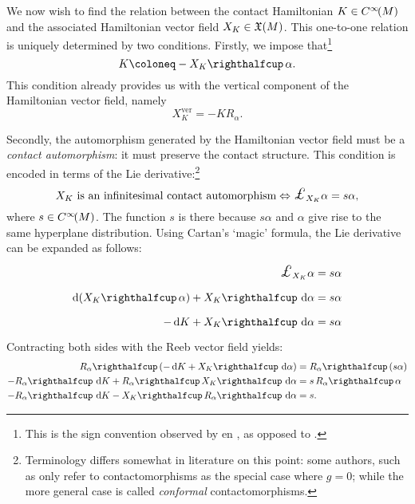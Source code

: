 We now wish to find the relation between the contact Hamiltonian \(K \in C^\infty\!\qty(M)\) and the associated Hamiltonian vector field \(X_K \in \mathfrak{X}\qty(M)\). This one-to-one relation is uniquely determined by two conditions. Firstly, we impose that\footnote{This is the sign convention observed by \citet{Bravetti2017} en \citet{VanderSchaft2021a}, as opposed to \citet{Libermann1987}.}
    \begin{equation}
     K \coloneq -\intpr{X_K}{\alpha}.
\end{equation}
This condition already provides us with the vertical component of the Hamiltonian vector field, namely
\begin{equation}
     X_K^\text{ver} = -K R_\alpha.
\end{equation}

Secondly, the automorphism generated by the Hamiltonian vector field must be a \emph{contact automorphism}: it must preserve the contact structure. This condition is encoded in terms of the Lie derivative:\footnote
{Terminology differs somewhat in literature on this point: some authors, such as \citet{DeLeon2020} only refer to contactomorphisms as the special case where \(g = 0\); while the more general case is called \emph{conformal} contactomorphisms.}
\begin{equation}
     X_K \text{ is an infinitesimal contact automorphism} \Leftrightarrow \lied{X_K}{\alpha} = s\alpha,
\end{equation}
where \(s \in C^\infty\!\qty(M)\). The function \(s\) is there because \(s \alpha \) and \(\alpha\) give rise to the same hyperplane distribution. 
Using Cartan's `magic' formula, the Lie derivative can be expanded as follows:
\begin{equation*}
    \begin{split}
        \lied{X_K}{\alpha} &= s \alpha\\
        \dd{\qty(\intpr{X_K}{\alpha})} + \intpr{X_K}{\dd{\alpha}} &= s\alpha \\
        -\dd{K} + \intpr{X_K}{\dd{\alpha}} &= s\alpha \\
    \end{split}
\end{equation*}
Contracting both sides with the Reeb vector field yields:
\begin{equation*}
    \begin{split}
        \intpr{R_\alpha}{\qty(-\dd{K} + \intpr{X_K}{\dd{\alpha}})} &= \intpr{R_\alpha}{\qty(s\alpha)} \\
        -\intpr{R_\alpha}{\dd{K}} + \intpr{R_\alpha}{\intpr{X_K}{\dd{\alpha}}} &= s\,\intpr{R_\alpha}{\alpha} \\
        -\intpr{R_\alpha}{\dd{K}} - \intpr{X_K}{\intpr{R_\alpha}{\dd{\alpha}}} &= s.
    \end{split}
\end{equation*}
